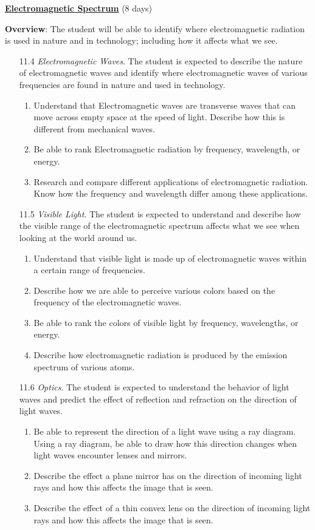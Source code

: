 \documentclass[dvipsnames]{article}
\begin{document}
\textbf{\underline{Electromagnetic Spectrum}} (8 days)

\textbf{Overview}: The student will be able to identify where electromagnetic radiation is used in nature and in technology; including how it affects what we see.

\begin{enumerate}
    \item[11.4] \textit{Electromagnetic Waves}. The student is expected to describe the nature of electromagnetic waves and identify where electromagnetic waves of various frequencies are found in nature and used in technology.
    \begin{enumerate}
        \item Understand that Electromagnetic waves are transverse waves that can move across empty space at the speed of light. Describe how this is different from mechanical waves.
        \item Be able to rank Electromagnetic radiation by frequency, wavelength, or energy.
        \item Research and compare different applications of electromagnetic radiation.  Know how the frequency and wavelength differ among these applications.
    \end{enumerate}
    \item[11.5] \textit{Visible Light}. The student is expected to understand and describe how the visible range of the electromagnetic spectrum affects what we see when looking at the world around us.
    \begin{enumerate}
        \item Understand that visible light is made up of electromagnetic waves within a certain range of frequencies.
        \item Describe how we are able to perceive various colors based on the frequency of the electromagnetic waves.
        \item Be able to rank the colors of visible light by frequency, wavelengths, or energy.
        \item Describe how electromagnetic radiation is produced by the emission spectrum of various atoms.
    \end{enumerate}
    \item[11.6] \textit{Optics}. The student is expected to understand the behavior of light waves and predict the effect of reflection and refraction on the direction of light waves.
    \begin{enumerate}
        \item Be able to represent the direction of a light wave using a ray diagram.  Using a ray diagram, be able to draw how this direction changes when light waves encounter lenses and mirrors.
        \item Describe the effect a plane mirror has on the direction of incoming light rays and how this affects the image that is seen.
        \item Describe the effect of a thin convex lens on the direction of incoming light rays and how this affects the image that is seen.
    \end{enumerate}
\end{enumerate}
\end{document}
